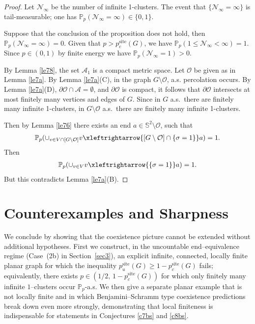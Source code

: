 \documentclass[11pt]{amsart}
\theoremstyle{plain}
\numberwithin{equation}{section}
\numberwithin{figure}{section}
\newcommand\PP{{\mathbb P}}
\newcommand\pcs{{p_c^{\mathrm{site}}}}
\begin{document}
\begin{proof}
Let $\mathcal{N}_{\infty}$ be the number of infinite 1-clusters. The event that $\{\mathcal{N}_{\infty}=\infty\}$ is tail-measurable; one has $\PP_p(\mathcal{N}_{\infty}=\infty)\in\{0,1\}$.

Suppose that the conclusion of the proposition does not hold, then $\PP_p(\mathcal{N}_{\infty}=\infty)=0$. Given that $p>\pcs(G)$, we have $\PP_p(1\leq \mathcal{N}_{\infty}<\infty)=1$. Since $p\in(0,1)$ by finite energy we have $\PP_p(\mathcal{N}_{\infty}=1)>0$.


By Lemma \ref{le78}, the set $\mathcal{A}_1$ is a compact metric space.
Let $\mathcal{O}$ be given as in Lemma \ref{le7a}. By Lemma \ref{le7a}(C), in the graph $G\setminus \mathcal{O}$, a.s. percolation occurs. By Lemma \ref{le7a}(D), $\partial \mathcal{O}\cap \mathcal{A}=\emptyset$, and $\partial{\mathcal{O}}$ is compact, it follows that $\partial \mathcal{O}$ intersects at most finitely many vertices and edges of $G$. Since in $G$ a.s.~there are finitely many infinite 1-clusters,
in $G\setminus \mathcal{O}$ a.s.~there are finitely many infinite 1-clusters. 

Then by Lemma \ref{le76} there exists an end $a\in \mathbb{S}^2\setminus \mathcal{O}$, such that
\begin{align*}
\PP_p(\cup_{v\in V\cap [G\setminus \mathcal{O}]}v\xleftrightarrow{[G\setminus\mathcal{O}]\cap \{\sigma=1\}}a)=1.
\end{align*}
Then 
\begin{align*}
\PP_p(\cup_{v\in V}v\xleftrightarrow{\{\sigma=1\}}a)=1.
\end{align*}
But this contradicts Lemma \ref{le7a}(B).
\end{proof}



\section{Counterexamples and Sharpness}\label{s8}


We conclude by showing that the coexistence picture cannot be extended without additional hypotheses.
First we construct, in the uncountable end--equivalence regime (Case~(2b) in Section~\ref{sec3}), an explicit infinite,
connected, locally finite planar graph for which the inequality $p^{\mathrm{site}}_u(G)\ge 1-p^{\mathrm{site}}_c(G)$
fails; equivalently, there exists $p\in(1/2,\,1-p^{\mathrm{site}}_c(G))$ for which only finitely many infinite
$1$--clusters occur $\PP_p$-a.s.
We then give a separate planar example that is not locally finite and in which Benjamini--Schramm type
coexistence predictions break down even more strongly, demonstrating that local finiteness is indispensable
for statements in Conjectures \ref{c7bs} and \ref{c8bs}.
\end{document}
